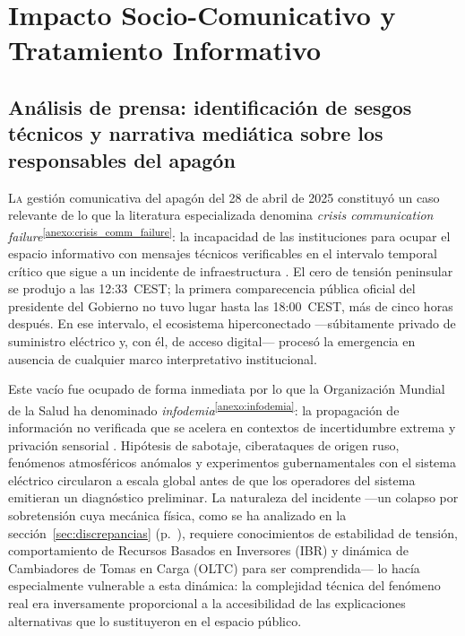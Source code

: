 
\chapter{Impacto Socio-Comunicativo y Tratamiento Informativo}
\label{cap:impacto_comunicativo}

\section{Análisis de prensa: identificación de sesgos técnicos y
narrativa mediática sobre los responsables del apagón}
\label{sec:analisis_prensa}

\lettrine[lines=3, lhang=0.1]{L}{a} gestión comunicativa del apagón del 28 de abril de 2025 constituyó
un caso relevante de lo que la literatura especializada denomina
\textit{crisis communication
failure}\textsuperscript{\ref{anexo:crisis_comm_failure}}: la
incapacidad de las instituciones para ocupar el espacio informativo
con mensajes técnicos verificables en el intervalo temporal crítico
que sigue a un incidente de infraestructura \cite{mitceepr2025}. El
cero de tensión peninsular se produjo a las 12:33~CEST; la primera
comparecencia pública oficial del presidente del Gobierno no tuvo
lugar hasta las 18:00~CEST, más de cinco horas después. En ese
intervalo, el ecosistema hiperconectado ---súbitamente privado de
suministro eléctrico y, con él, de acceso digital--- procesó la
emergencia en ausencia de cualquier marco interpretativo
institucional.

Este vacío fue ocupado de forma inmediata por lo que la Organización
Mundial de la Salud ha denominado
\textit{infodemia}\textsuperscript{\ref{anexo:infodemia}}: la
propagación de información no verificada que se acelera en contextos
de incertidumbre extrema y privación sensorial \cite{blackswan2025}.
Hipótesis de sabotaje, ciberataques de origen ruso, fenómenos
atmosféricos anómalos y experimentos gubernamentales con el sistema
eléctrico circularon a escala global antes de que los operadores del
sistema emitieran un diagnóstico preliminar. La naturaleza del
incidente ---un colapso por sobretensión cuya mecánica física, como
se ha analizado en la sección~\ref{sec:discrepancias}
(p.~\pageref{sec:discrepancias}), requiere conocimientos de
estabilidad de tensión, comportamiento de Recursos Basados en
Inversores (IBR) y dinámica de Cambiadores de Tomas en Carga (OLTC)
para ser comprendida--- lo hacía especialmente vulnerable a esta
dinámica: la complejidad técnica del fenómeno real era inversamente
proporcional a la accesibilidad de las explicaciones alternativas que
lo sustituyeron en el espacio público.

